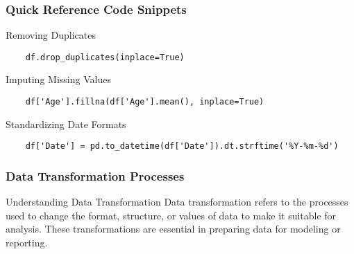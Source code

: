 \documentclass{beamer}
\begin{document}
\begin{frame}[fragile]
    \frametitle{Quick Reference Code Snippets}
    \begin{block}{Removing Duplicates}
    \begin{lstlisting}
    df.drop_duplicates(inplace=True)
    \end{lstlisting}
    \end{block}

    \begin{block}{Imputing Missing Values}
    \begin{lstlisting}
    df['Age'].fillna(df['Age'].mean(), inplace=True)
    \end{lstlisting}
    \end{block}

    \begin{block}{Standardizing Date Formats}
    \begin{lstlisting}
    df['Date'] = pd.to_datetime(df['Date']).dt.strftime('%Y-%m-%d')
    \end{lstlisting}
    \end{block}
\end{frame}

\begin{frame}[fragile]
    \frametitle{Data Transformation Processes}
    \begin{block}{Understanding Data Transformation}
        Data transformation refers to the processes used to change the format, structure, or values of data to make it suitable for analysis. These transformations are essential in preparing data for modeling or reporting. 
    \end{block}
\end{frame}
\end{document}
